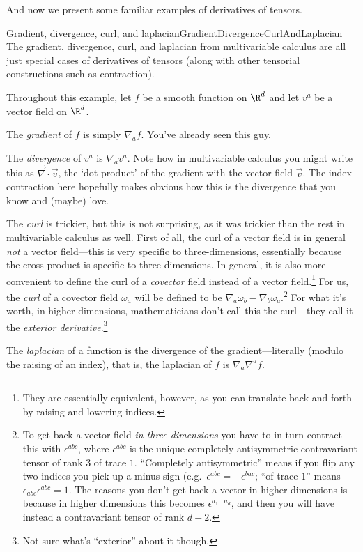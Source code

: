 And now we present some familiar examples of derivatives of tensors.
\begin{exm}{Gradient, divergence, curl, and laplacian}{GradientDivergenceCurlAndLaplacian}
The gradient, divergence, curl, and laplacian from multivariable calculus are all just special cases of derivatives of tensors (along with other tensorial constructions such as contraction).

Throughout this example, let $f$ be a smooth function on $\R ^d$ and let $v^a$ be a vector field on $\R ^d$. 

The \emph{gradient} of $f$ is simply $\nabla _af$.  You've already seen this guy.

The \emph{divergence} of $v^a$ is $\nabla _av^a$.  Note how in multivariable calculus you might write this as $\vec{\nabla}\cdot \vec{v}$, the `dot product' of the gradient with the vector field $\vec{v}$.  The index contraction here hopefully makes obvious how this is the divergence that you know and (maybe) love.

The \emph{curl} is trickier, but this is not surprising, as it was trickier than the rest in multivariable calculus as well.  First of all, the curl of a vector field is in general \emph{not} a vector field---this is very specific to three-dimensions, essentially because the cross-product is specific to three-dimensions.  In general, it is also more convenient to define the curl of a \emph{covector} field instead of a vector field.\footnote{They are essentially equivalent, however, as you can translate back and forth by raising and lowering indices.}  For us, the \emph{curl} of a covector field $\omega _a$ will be defined to be $\nabla _a\omega _b-\nabla _b\omega _a$.\footnote{To get back a vector field \emph{in three-dimensions} you have to in turn contract this with $\epsilon ^{abc}$, where $\epsilon ^{abc}$ is the unique completely antisymmetric contravariant tensor of rank $3$ of trace $1$.  ``Completely antisymmetric'' means if you flip any two indices you pick-up a minus sign (e.g.~$\epsilon ^{abc}=-\epsilon ^{bac}$; ``of trace $1$'' means $\epsilon _{abc}\epsilon ^{abc}=1$.  The reasons you don't get back a vector in higher dimensions is because in higher dimensions this becomes $\epsilon ^{a_1\ldots a_d}$, and then you will have instead a contravariant tensor of rank $d-2$.}  For what it's worth, in higher dimensions, mathematicians don't call this the curl---they call it the \emph{exterior derivative}.\footnote{Not sure what's ``exterior'' about it though.}

The \emph{laplacian} of a function is the divergence of the gradient---literally (modulo the raising of an index), that is, the laplacian of $f$ is $\nabla _a\nabla ^af$.
\end{exm}

